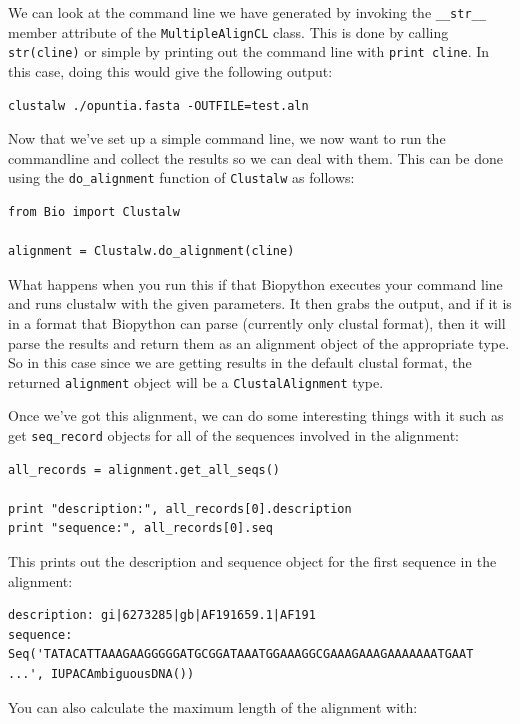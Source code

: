 \documentclass{report}
\begin{document}
We can look at the command line we have generated by invoking the \verb|__str__| member attribute of the \verb|MultipleAlignCL| class. This is done by calling \verb|str(cline)| or simple by printing out the command line with \verb|print cline|. In this case, doing this would give the following output:

\begin{verbatim}
clustalw ./opuntia.fasta -OUTFILE=test.aln
\end{verbatim}

Now that we've set up a simple command line, we now want to run the commandline and collect the results so we can deal with them. This can be done using the \verb|do_alignment| function of \verb|Clustalw| as follows:

\begin{verbatim}
from Bio import Clustalw

alignment = Clustalw.do_alignment(cline)
\end{verbatim}

What happens when you run this if that Biopython executes your command line and runs clustalw with the given parameters. It then grabs the output, and if it is in a format that Biopython can parse (currently only clustal format), then it will parse the results and return them as an alignment object of the appropriate type. So in this case since we are getting results in the default clustal format, the returned \verb|alignment| object will be a \verb|ClustalAlignment| type.

Once we've got this alignment, we can do some interesting things with it such as get \verb|seq_record| objects for all of the sequences involved in the alignment:

\begin{verbatim}
all_records = alignment.get_all_seqs()

print "description:", all_records[0].description
print "sequence:", all_records[0].seq
\end{verbatim}

This prints out the description and sequence object for the first sequence in the alignment:

\begin{verbatim}
description: gi|6273285|gb|AF191659.1|AF191
sequence: Seq('TATACATTAAAGAAGGGGGATGCGGATAAATGGAAAGGCGAAAGAAAGAAAAAAATGAAT
...', IUPACAmbiguousDNA())
\end{verbatim}

You can also calculate the maximum length of the alignment with:
\end{document}
